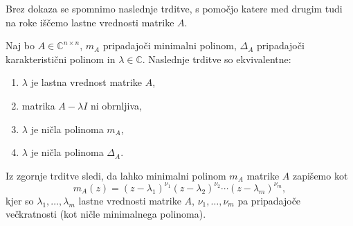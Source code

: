 \documentclass[mat1]{fmfdelo}
\newcommand{\C}{\mathbb C}
\begin{document}
Brez dokaza se spomnimo naslednje trditve, s pomočjo katere med drugim tudi na roke iščemo lastne vrednosti matrike $A$.
\begin{trditev}
    Naj bo $A \in \C^{n \times n}$, $m_A$ pripadajoči minimalni polinom, $\Delta_A$ pripadajoči karakteristični polinom in $\lambda \in \C$. Naslednje trditve so ekvivalentne:
    \begin{enumerate}
        \item $\lambda$ je lastna vrednost matrike $A$,
        \item matrika $A- \lambda I$ ni obrnljiva,
        \item $\lambda$ je ničla polinoma $m_A$,
        \item $\lambda$ je ničla polinoma $\Delta_A$.
    \end{enumerate}
\end{trditev}

Iz zgornje trditve sledi, da lahko minimalni polinom $m_A$ matrike $A$ zapišemo kot
\begin{equation*}
    m_A(z) = \left(z-\lambda_1\right)^{\nu_1}\left(z-\lambda_2\right)^{\nu_2}\cdots \left(z-\lambda_m\right)^{\nu_m},
\end{equation*}
kjer so $\lambda_1, \ldots, \lambda_m$ lastne vrednosti matrike $A$, $\nu_1, \ldots, \nu_m$ pa pripadajoče večkratnosti (kot ničle minimalnega polinoma).
\end{document}
